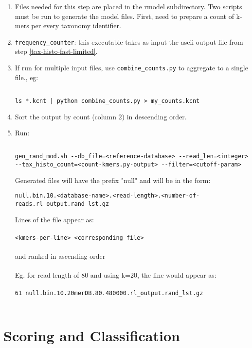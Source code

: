 \documentclass[11pt]{article}
\begin{document}
\begin{enumerate}
\item
Files needed for this step are placed in the rmodel subdirectory.  Two
scripts must be run to generate the model files. First, need to
prepare a count of k-mers per every taxonomy identifier.
\item
\texttt{frequency\_counter}: this executable takes as input the ascii output file from step \ref{tax-histo-fast-limited}. 
\item

If run for multiple input files, use \texttt{combine\_counts.py} to aggregate to a single file., eg:
\begin{verbatim}

ls *.kcnt | python combine_counts.py > my_counts.kcnt
\end{verbatim}
\item
Sort the output by count (column 2) in descending order.
\item 
Run:
\begin{verbatim}

gen_rand_mod.sh --db_file=<reference-database> --read_len=<integer> --tax_histo_count=<count-kmers.py-output> --filter=<cutoff-param>
\end{verbatim}

Generated files will have the prefix "null" and will be in the form:

\texttt{null.bin.10.<database-name>.<read-length>.<number-of-reads.rl\_output.rand\_lst.gz}

Lines of the file appear as:\\
\\
\texttt{<kmers-per-line> <corresponding file>}\\
\\
 and ranked in ascending order\\
\\
Eg. for read length of 80 and using k=20, the line would appear as:\\
\\
\texttt{61 null.bin.10.20merDB.80.480000.rl\_output.rand\_lst.gz}\\
\\
\end{enumerate}

\section{Scoring and Classification}
\label{sec:scoring}
\end{document}
